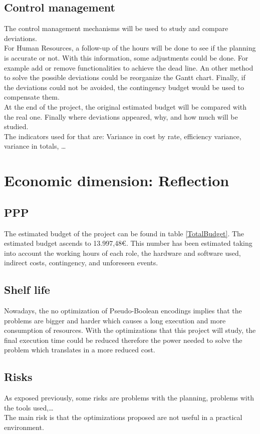 \subsection{Control management}
The control management mechanisms will be used to study and compare deviations.\\

For Human Resources, a follow-up of the hours will be done to see if the planning is accurate or not. With this information, some adjustments could be done. For example add or remove functionalities to achieve the dead line. An other method to solve the possible deviations could be reorganize the Gantt chart. Finally, if the deviations could not be avoided, the contingency budget would be used to compensate them.\\

At the end of the project, the original estimated budget will be compared with the real one. Finally where deviations appeared, why, and how much will be studied. \\

The indicators used for that are: Variance in cost by rate, efficiency variance, variance in totals, \ldots

\section{Economic dimension: Reflection}

\subsection{PPP}
The estimated budget of the project can be found in table \ref{TotalBudget}. The estimated budget ascends to 13.997,48€. This number has been estimated taking into account the working hours of each role, the hardware and software used, indirect costs, contingency, and unforeseen events. 
\subsection{Shelf life}
Nowadays, the no optimization of Pseudo-Boolean encodings implies that the problems are bigger and harder which causes a long execution and more consumption of resources. With the optimizations that this project will study, the final execution time could be reduced therefore the power needed to solve the problem which translates in a more reduced cost.

\subsection{Risks}
As exposed previously, some risks are problems with the planning, problems with the tools used,\ldots\\
The main risk is that the optimizations proposed are not useful in a practical environment. 

